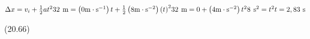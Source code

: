 {\begin{mdframed}[linewidth=4, leftmargin=40, rightmargin=40]
\begin{exercise}
\begin{enumerate}[noitemsep, label=\textbf{Step} \textbf{\arabic*}. ]
{\begin{minipage}{\columnwidth}
    \parbox[t]{\mymathboxwidth}{\large\begin{math}
    \Delta x={v}_{i}+\frac{1}{2}a{t}^{2}32\phantom{\rule{4pt}{0ex}}\mathrm{m}=\left(0\mathrm{m}\ensuremath{\cdot}{\mathrm{s}}^{-1}\right)t+\frac{1}{2}\left(8\mathrm{m}\ensuremath{\cdot}{\mathrm{s}}^{-2}\right){\left(t\right)}^{2}32\phantom{\rule{4pt}{0ex}}\mathrm{m}=0+\left(4\mathrm{m}\ensuremath{\cdot}{\mathrm{s}}^{-2}\right){t}^{2}8\phantom{\rule{4pt}{0ex}}{\mathrm{s}}^{2}={t}^{2}t=2,83\phantom{\rule{3.33333pt}{0ex}}\mathrm{s}\end{math}}\hfill
    \parbox[t]{48pt}{\raggedleft 
    (20.66)}
    \end{minipage}\vspace{12pt}\par
    }%
    

\end{enumerate}
\end{exercise}
\end{mdframed}}
